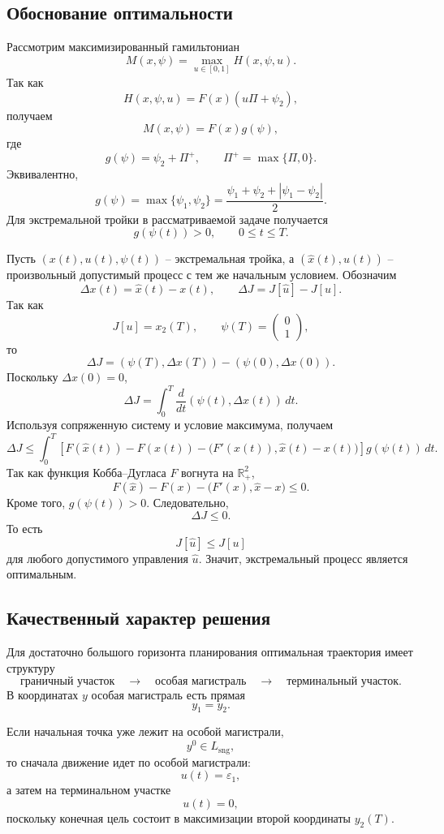 \documentclass[12pt,a4paper]{article}
\newcommand{\R}{\mathbb{R}}
\newcommand{\eps}{\varepsilon}
\newcommand{\sng}{\mathrm{sng}}
\begin{document}
\subsection{Обоснование оптимальности}

Рассмотрим максимизированный гамильтониан
\[
    M(x,\psi)=\max_{u\in[0,1]}H(x,\psi,u).
\]
Так как
\[
    H(x,\psi,u)=F(x)(u\Pi+\psi_2),
\]
получаем
\[
    M(x,\psi)=F(x)g(\psi),
\]
где
\[
    g(\psi)=\psi_2+\Pi^+,
    \qquad
    \Pi^+=\max\{\Pi,0\}.
\]
Эквивалентно,
\[
    g(\psi)=\max\{\psi_1,\psi_2\}
    =\frac{\psi_1+\psi_2+|\psi_1-\psi_2|}{2}.
\]
Для экстремальной тройки в рассматриваемой задаче получается
\[
    g(\psi(t))>0,
    \qquad
    0\le t\le T.
\]

Пусть \((x(t),u(t),\psi(t))\) -- экстремальная тройка, а \((\widehat x(t),\widehat u(t))\) -- произвольный допустимый процесс с тем же начальным условием. Обозначим
\[
    \Delta x(t)=\widehat x(t)-x(t),
    \qquad
    \Delta J=J[\widehat u]-J[u].
\]
Так как
\[
    J[u]=x_2(T),
    \qquad
    \psi(T)=
    \begin{pmatrix}
        0\\1
    \end{pmatrix},
\]
то
\[
    \Delta J=(\psi(T),\Delta x(T))-(\psi(0),\Delta x(0)).
\]
Поскольку \(\Delta x(0)=0\),
\[
    \Delta J=\int_0^T \frac{d}{dt}(\psi(t),\Delta x(t))\,dt.
\]
Используя сопряженную систему и условие максимума, получаем
\[
    \Delta J\le
    \int_0^T
    \left[ F(\widehat x(t))-F(x(t))-\bigl(F'(x(t)),\widehat x(t)-x(t)\bigr)\right]
    g(\psi(t))\,dt.
\]
Так как функция Кобба--Дугласа \(F\) вогнута на \(\R^2_+\),
\[
    F(\widehat x)-F(x)-\bigl(F'(x),\widehat x-x\bigr)\le0.
\]
Кроме того, \(g(\psi(t))>0\). Следовательно,
\[
    \Delta J\le0.
\]
То есть
\[
    J[\widehat u]\le J[u]
\]
для любого допустимого управления \(\widehat u\). Значит, экстремальный процесс является оптимальным.

\subsection{Качественный характер решения}

Для достаточно большого горизонта планирования оптимальная траектория имеет структуру
\[
    \text{граничный участок}
    \quad\longrightarrow\quad
    \text{особая магистраль}
    \quad\longrightarrow\quad
    \text{терминальный участок}.
\]
В координатах \(y\) особая магистраль есть прямая
\[
    y_1=y_2.
\]

Если начальная точка уже лежит на особой магистрали,
\[
    y^0\in L_{\sng},
\]
то сначала движение идет по особой магистрали:
\[
    u(t)=\eps_1,
\]
а затем на терминальном участке
\[
    u(t)=0,
\]
поскольку конечная цель состоит в максимизации второй координаты \(y_2(T)\).
\end{document}
